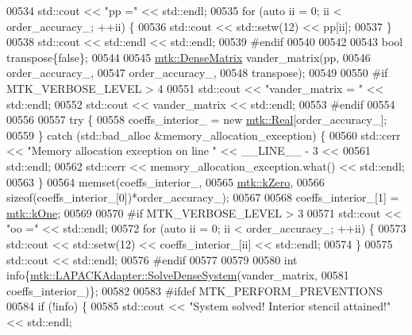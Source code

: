 \begin{DoxyCode}
{{00534   std::cout << \textcolor{stringliteral}{"pp ="} << std::endl;
00535   \textcolor{keywordflow}{for} (\textcolor{keyword}{auto} ii = 0; ii < order\_accuracy\_; ++ii) \{
00536     std::cout << std::setw(12) << pp[ii];
00537   \}
00538   std::cout << std::endl << std::endl;
00539 \textcolor{preprocessor}{  #endif}
00540 
00542 
00543   \textcolor{keywordtype}{bool} transpose\{\textcolor{keyword}{false}\};
00544 
00545   \hyperlink{classmtk_1_1DenseMatrix}{mtk::DenseMatrix} vander\_matrix(pp,
00546                                  order\_accuracy\_,
00547                                  order\_accuracy\_,
00548                                  transpose);
00549 
00550 \textcolor{preprocessor}{  #if MTK\_VERBOSE\_LEVEL > 4}
00551   std::cout << \textcolor{stringliteral}{"vander\_matrix = "} << std::endl;
00552   std::cout << vander\_matrix << std::endl;
00553 \textcolor{preprocessor}{  #endif}
00554 
00556 
00557   \textcolor{keywordflow}{try} \{
00558     coeffs\_interior\_ = \textcolor{keyword}{new} \hyperlink{group__c01-roots_gac080bbbf5cbb5502c9f00405f894857d}{mtk::Real}[order\_accuracy\_];
00559   \} \textcolor{keywordflow}{catch} (std::bad\_alloc &memory\_allocation\_exception) \{
00560     std::cerr << \textcolor{stringliteral}{"Memory allocation exception on line "} << \_\_LINE\_\_ - 3 <<
00561       std::endl;
00562     std::cerr << memory\_allocation\_exception.what() << std::endl;
00563   \}
00564   memset(coeffs\_interior\_,
00565          \hyperlink{group__c01-roots_ga59a451a5fae30d59649bcda274fea271}{mtk::kZero},
00566          \textcolor{keyword}{sizeof}(coeffs\_interior\_[0])*order\_accuracy\_);
00567 
00568   coeffs\_interior\_[1] = \hyperlink{group__c01-roots_ga26407c24d43b6b95480943340d285c71}{mtk::kOne};
00569 
00570 \textcolor{preprocessor}{  #if MTK\_VERBOSE\_LEVEL > 3}
00571   std::cout << \textcolor{stringliteral}{"oo ="} << std::endl;
00572   \textcolor{keywordflow}{for} (\textcolor{keyword}{auto} ii = 0; ii < order\_accuracy\_; ++ii) \{
00573     std::cout << std::setw(12) << coeffs\_interior\_[ii] << std::endl;
00574   \}
00575   std::cout << std::endl;
00576 \textcolor{preprocessor}{  #endif}
00577 
00579 
00580   \textcolor{keywordtype}{int} info\{\hyperlink{classmtk_1_1LAPACKAdapter_a7428bccf74fd4a4af68fb7233846da22}{mtk::LAPACKAdapter::SolveDenseSystem}(vander\_matrix,
00581                                                 coeffs\_interior\_)\};
00582 
00583 \textcolor{preprocessor}{  #ifdef MTK\_PERFORM\_PREVENTIONS}
00584   \textcolor{keywordflow}{if} (!info) \{
00585     std::cout << \textcolor{stringliteral}{"System solved! Interior stencil attained!"} << std::endl;
}}
\end{DoxyCode}
